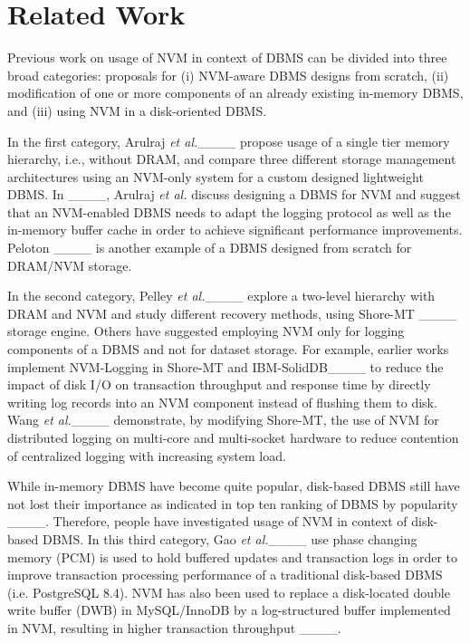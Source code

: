 \section{Related Work}
\label{sec:RelatedWork}
Previous work on usage of NVM in context of DBMS
can be divided into three broad categories: proposals for (i)
NVM-aware DBMS designs from scratch, (ii) modification of
one or more components of an already existing in-memory
DBMS, and (iii) using NVM in a disk-oriented DBMS.

In the first category, Arulraj \textit{et al.}____ propose usage of a single tier memory hierarchy, i.e., without DRAM, and compare three different storage management architectures using an NVM-only system for a custom designed lightweight DBMS. In ____, Arulraj \textit{et al.} discuss designing a DBMS for NVM and suggest that an NVM-enabled DBMS needs to adapt the logging protocol as well as the in-memory buffer cache in order to achieve significant performance improvements. Peloton ____ is another example of a DBMS designed from scratch for DRAM/NVM storage.

In the second category, Pelley \textit{et al.}____ explore a two-level hierarchy with DRAM and NVM and study different recovery methods, using Shore-MT ____ storage engine. Others have suggested employing NVM only for logging components of a DBMS and not for dataset storage. For example, earlier works implement NVM-Logging in Shore-MT and IBM-SolidDB____ to reduce the impact of disk I/O on transaction throughput and response time by directly writing log records into an NVM component instead of flushing them to disk. Wang \textit{et al.}____ demonstrate, by modifying Shore-MT, the use of NVM for distributed logging on multi-core and multi-socket hardware to reduce contention of centralized logging with increasing system load.

While in-memory DBMS have become quite popular, disk-based DBMS still have not lost their importance as indicated in  top ten ranking of DBMS by popularity ____. Therefore, people have investigated usage of NVM in context of disk-based DBMS. In this third category, Gao \textit{et al.}____ use phase changing memory (PCM) is used to hold buffered updates and transaction logs in order to improve transaction processing performance of a traditional disk-based DBMS (i.e. PostgreSQL 8.4). NVM has also been used to replace a disk-located double write buffer (DWB) in MySQL/InnoDB by a log-structured buffer implemented in NVM, resulting in higher transaction throughput ____.

